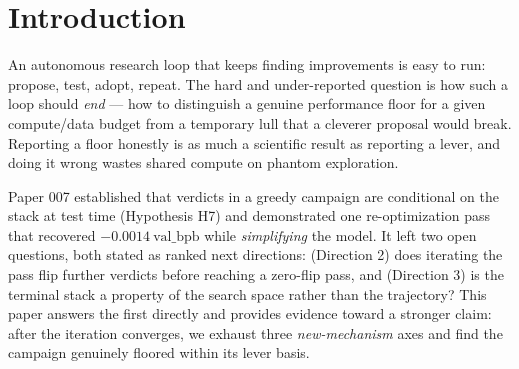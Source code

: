 \documentclass{article}
\newcommand{\valbpb}{\mathrm{val\_bpb}}
\begin{document}
\section{Introduction}
\label{sec:intro}

An autonomous research loop that keeps finding improvements is easy to run: propose, test, adopt, repeat. The hard and under-reported question is how such a loop should \emph{end} --- how to distinguish a genuine performance floor for a given compute/data budget from a temporary lull that a cleverer proposal would break. Reporting a floor honestly is as much a scientific result as reporting a lever, and doing it wrong wastes shared compute on phantom exploration.

Paper 007 \cite{ophis2026staleness} established that verdicts in a greedy campaign are conditional on the stack at test time (Hypothesis H7) and demonstrated one re-optimization pass that recovered $-0.0014\ \valbpb$ while \emph{simplifying} the model. It left two open questions, both stated as ranked next directions: (Direction 2) does iterating the pass flip further verdicts before reaching a zero-flip pass, and (Direction 3) is the terminal stack a property of the search space rather than the trajectory? This paper answers the first directly and provides evidence toward a stronger claim: after the iteration converges, we exhaust three \emph{new-mechanism} axes and find the campaign genuinely floored within its lever basis.
\end{document}
